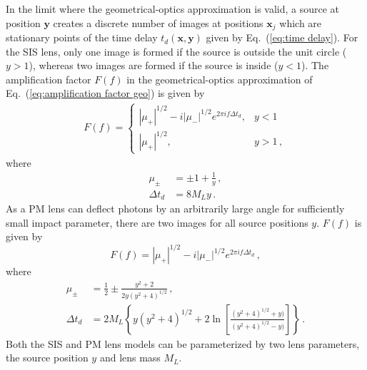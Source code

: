 \documentclass[floats,floatfix,showpacs,amssymb,prd,twocolumn,superscriptaddress,nofootinbib,nolongbibliography,reprint]{revtex4-2}
\renewcommand{\vec}[1]{\mathbf{#1}}
\begin{document}
In the limit where the geometrical-optics approximation is valid, a source at position $\vec{y}$ creates a discrete number of images at positions $\vec{x}_j$ which are stationary points of the time delay $t_d(\vec{x}, \vec{y})$ given by Eq.~(\ref{eq:time delay}). For the SIS lens, only one image is formed if the source is outside the unit circle ($y > 1$), whereas two images are formed if the source is inside ($y < 1$). The amplification factor $F(f)$ in the geometrical-optics approximation of  Eq.~(\ref{eq:amplification factor geo}) is given by \cite{Takahashi_2003}
\begin{align}\label{eq:amp factor sis geo}
    F(f) = 
    \begin{cases}
    |\mu_+|^{1/2} - i |\mu_-|^{1/2} e^{2 \pi i f \Delta t_d},&  y < 1\\
    |\mu_+|^{1/2},              & y > 1\,,
    \end{cases}
\end{align}
where
\begin{subequations} \label{E:SISip}
\begin{align}
    \mu_\pm &= \pm 1 + \frac{1}{y}\,, \label{E:SISmag} \\
    \Delta t_d &= 8M_Ly\,. \label{E:SIStd}
\end{align}
\end{subequations}
As a PM lens can deflect photons by an arbitrarily large angle for sufficiently small impact parameter, there are two images for all source positions $y$. $F(f)$ is given by \cite{Takahashi_2003}
\begin{equation}\label{eq:amp factor pm geo}
    F(f) = |\mu_+|^{1/2} - i |\mu_-|^{1/2} e^{2 \pi i f \Delta t_d}\,,
\end{equation}
where
\begin{subequations} \label{E:PMip}
\begin{align}
    \mu_\pm &= \frac{1}{2} \pm \frac{y^2 + 2}{2y(y^2 + 4)^{1/2}}\,,
    \label{E:PMmag} \\
    \Delta t_d &= 2M_L \left\{ y(y^2 + 4)^{1/2} + 2\ln \left[ \frac{(y^2 + 4)^{1/2} + y)}{(y^2 + 4)^{1/2} - y)} \right] \right\}\,. \label{E:PMtd}
\end{align}
\end{subequations}
Both the SIS and PM lens models can be parameterized by two lens parameters, the source position $y$ and lens mass $M_L$. 
\end{document}
